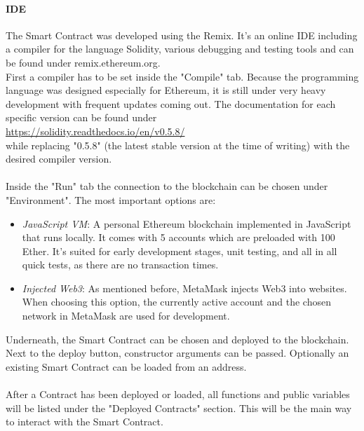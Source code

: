 \paragraph{IDE}
The Smart Contract was developed using the Remix. It's an online IDE including a compiler for the language Solidity, various debugging and testing tools and can be found under remix.ethereum.org.
\\
First a compiler has to be set inside the "Compile" tab. Because the programming language was designed especially for Ethereum, it is still under very heavy development with frequent updates coming out. The documentation for each specific version can be found under
\\
\url{https://solidity.readthedocs.io/en/v0.5.8/}
\\
while replacing "0.5.8" (the latest stable version at the time of writing) with the desired compiler version.
\\\\
Inside the "Run" tab the connection to the blockchain can be chosen under "Environment". The most important options are:
\begin{itemize}
    \item \textit{JavaScript VM}: A personal Ethereum blockchain implemented in JavaScript that runs locally. It comes with 5 accounts which are preloaded with 100 Ether. It's suited for early development stages, unit testing, and all in all quick tests, as there are no transaction times.
    \item \textit{Injected Web3}: As mentioned before, MetaMask injects Web3 into websites. When choosing this option, the currently active account and the chosen network in MetaMask are used for development.
\end{itemize}
Underneath, the Smart Contract can be chosen and deployed to the blockchain. Next to the deploy button, constructor arguments can be passed. Optionally an existing Smart Contract can be loaded from an address.
\\\\
After a Contract has been deployed or loaded, all functions and public variables will be listed under the "Deployed Contracts" section. This will be the main way to interact with the Smart Contract.
\\
